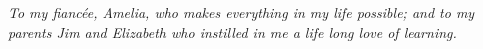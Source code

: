 



\begin{center}
\vspace*{52pt}

    \emph{To my fiancée, Amelia, who makes everything in my life possible; and to my parents Jim and Elizabeth who instilled in me a life long love of learning.}
\end{center}

\pagebreak